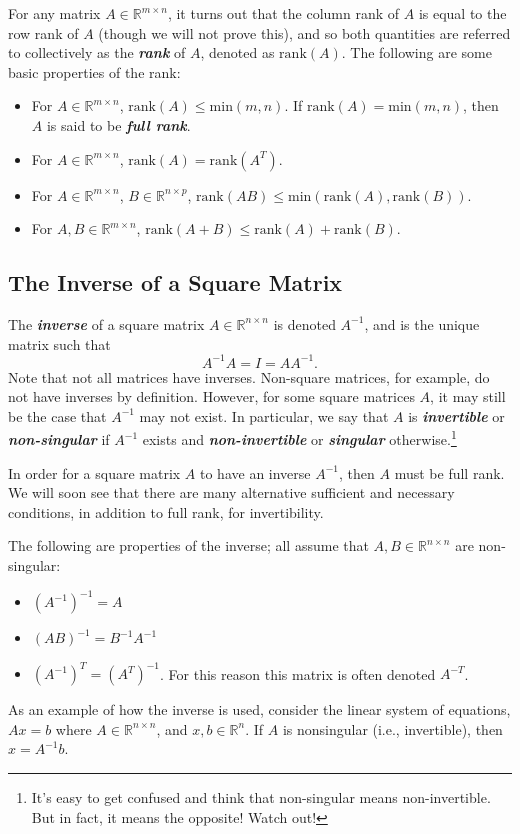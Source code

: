 \documentclass[12pt]{article}
\begin{document}
For any matrix $A \in \mathbb{R}^{m \times n}$, it turns out that
the column rank of $A$ is equal to the row rank of $A$ (though we will not prove this), and so both quantities
are referred to collectively as the \textbf{\textit{rank}} of $A$, denoted as
$\mathrm{rank}(A)$.  The following are some basic properties of the
rank: 
\begin{itemize}
\item For $A \in \mathbb{R}^{m \times n}$, $\mathrm{rank}(A) \leq
    \mathrm{min}(m,n)$.  If $\mathrm{rank}(A) = \mathrm{min}(m,n)$,
    then $A$ is said to be \textbf{\textit{full rank}}. 
  \item For $A \in \mathbb{R}^{m \times n}$, $\mathrm{rank}(A) =
    \mathrm{rank}(A^T)$.
  \item For $A \in \mathbb{R}^{m \times n}$, $B \in \mathbb{R}^{n
    \times p}$, $\mathrm{rank}(AB) \leq \mathrm{min}(\mathrm{rank}(A),
    \mathrm{rank}(B))$.
  \item For $A,B \in \mathbb{R}^{m \times n}$, $\mathrm{rank}(A + B)
    \leq \mathrm{rank}(A) + \mathrm{rank}(B)$.
\end{itemize}

\subsection{The Inverse of a Square Matrix}

The \textbf{\textit{inverse}} of a square matrix $A \in \mathbb{R}^{n
  \times n}$ is denoted $A^{-1}$, and is the unique matrix such that
\[A^{-1} A = I = A A^{-1}.\]  
Note that not all matrices have inverses.  Non-square matrices, for example,
do not have inverses by definition.  However, for some square matrices
$A$, it may still be the case that $A^{-1}$ may not exist.  In particular,
we say that $A$ is \textbf{\textit{invertible}} or
\textbf{\textit{non-singular}} if $A^{-1}$ exists and
\textbf{\textit{non-invertible}} or \textbf{\textit{singular}}
otherwise.\footnote{It's easy to get confused and think that non-singular means non-invertible.  But in fact, it means the opposite!  Watch out!}  

In order for a square matrix $A$ to have an inverse $A^{-1}$, then
$A$ must be full rank.  We will soon see that there are many
alternative sufficient and necessary conditions, in addition to full
rank, for invertibility.  

The following are properties of the inverse;
all assume that $A, B \in \mathbb{R}^{n \times n}$ are non-singular:
\begin{itemize}
\item $(A^{-1})^{-1} = A$
\item $(AB)^{-1} = B^{-1} A^{-1}$
\item $(A^{-1})^T = (A^T)^{-1}$.  For this reason this matrix is often
  denoted $A^{-T}$.
\end{itemize}
As an example of how the inverse is used, consider the linear system of equations,
$Ax = b$ where $A \in \mathbb{R}^{n \times n}$, and $x, b \in \mathbb{R}^n$.  If
$A$ is nonsingular (i.e., invertible), then $x = A^{-1} b$.   
\end{document}
